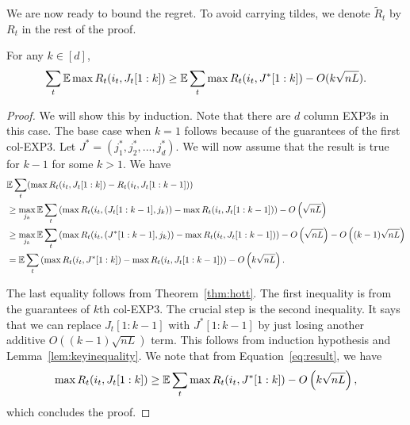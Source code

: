 We are now ready to bound the regret. %
To avoid carrying tildes, we denote $\tilde{R}_t$ by $R_t$ in the rest of the proof.
\begin{lemma}
For any $k \in [d]$,
$$ \sum_t \mathbb{E} \max R_t(i_t,J_t[1:k]) \geq  \mathbb{E} \sum_t \max R_t(i_t,J^*[1:k]) - O(k\sqrt{nL}).$$ 
\end{lemma}
\begin{proof}
We will show this by induction. Note that there are $d$ column EXP3s in this case. The base case when $k=1$ follows because of the guarantees of the first col-EXP3.
Let $J^* = (j_1^*,j_2^*,...,j_d^*).$   We will now assume that the result is true for $k-1$ for some $k>1.$
We have 
\begin{align}
& \mathbb{E}  \sum_t (\max R_t(i_t,J_t[1:k]) - R_t(i_t,J_t[1:k-1])) \\
&\geq \max_{j_k} \mathbb{E} \sum_t \left( \max R_t(i_t,(J_t[1:k-1],j_k)) - \max R_t(i_t,J_t[1:k-1]) \right) - O\left(\sqrt{nL}\right) \\
&\geq \max_{j_k} \mathbb{E} \sum_t  \left( \max R_t(i_t,(J^*[1:k-1],j_k))  - \max R_t(i_t,J_t[1:k-1]) \right) - O\left( \sqrt{nL} \right) - O\left( (k-1)\sqrt{nL} \right)   \\
\label{eq:result}
& =  \mathbb{E} \sum_t \left( \max R_t(i_t,J^*[1:k]) - \max R_t(i_t,J_t[1:k-1]) \right) - O\left( k\sqrt{nL} \right).
\end{align}

The last equality follows from Theorem~\ref{thm:hott}.  The first inequality is from the guarantees of $k$th col-EXP3.  The crucial step is  the second inequality. It says that we can replace $J_t[1:k-1]$ with $J^*[1:k-1]$ by just losing another additive $O\left( (k-1) \sqrt{nL} \right)$ term. This follows from induction hypothesis and Lemma~\ref{lem:keyinequality}. We note that from Equation~\ref{eq:result}, we have
$$ \max R_t(i_t,J_t[1:k]) \geq  \mathbb{E} \sum_t \max R_t(i_t,J^*[1:k]) - O\left( k \sqrt{nL} \right),$$
which concludes the proof.
\end{proof}
